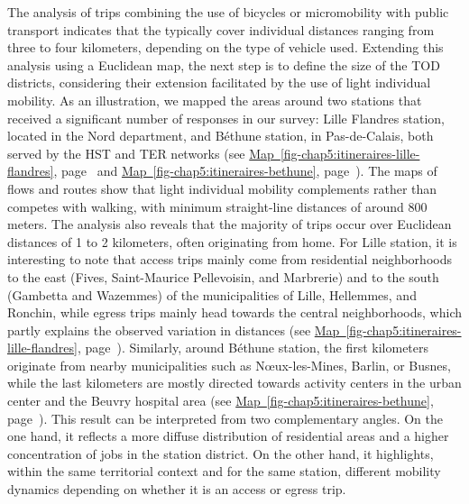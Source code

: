 \begin{refsegment}
The analysis of trips combining the use of bicycles or micromobility with public transport indicates that the  typically cover individual distances ranging from three to four kilometers, depending on the type of vehicle used. Extending this analysis using a Euclidean map, the next step is to define the size of the \acrshort{TOD} districts, considering their extension facilitated by the use of light individual mobility. As an illustration, we mapped the areas around two stations that received a significant number of responses in our survey: Lille Flandres station, located in the Nord department, and Béthune station, in Pas-de-Calais, both served by the \acrshort{HST} and \acrshort{TER} networks (see \hyperref[fig-chap5:itineraires-lille-flandres]{Map~\ref{fig-chap5:itineraires-lille-flandres}}, page~\pageref{fig-chap5:itineraires-lille-flandres} and \hyperref[fig-chap5:itineraires-bethune]{Map~\ref{fig-chap5:itineraires-bethune}}, page~\pageref{fig-chap5:itineraires-bethune}). The maps of flows and routes show that light individual mobility complements rather than competes with walking, with minimum straight-line distances of around 800 meters. The analysis also reveals that the majority of trips occur over Euclidean distances of 1 to 2 kilometers, often originating from home. For Lille station, it is interesting to note that access trips mainly come from residential neighborhoods to the east (Fives, Saint-Maurice Pellevoisin, and Marbrerie) and to the south (Gambetta and Wazemmes) of the municipalities of Lille, Hellemmes, and Ronchin, while egress trips mainly head towards the central neighborhoods, which partly explains the observed variation in distances (see \hyperref[fig-chap5:itineraires-lille-flandres]{Map~\ref{fig-chap5:itineraires-lille-flandres}}, page~\pageref{fig-chap5:itineraires-lille-flandres}). Similarly, around Béthune station, the first kilometers originate from nearby municipalities such as Nœux-les-Mines, Barlin, or Busnes, while the last kilometers are mostly directed towards activity centers in the urban center and the Beuvry hospital area (see \hyperref[fig-chap5:itineraires-bethune]{Map~\ref{fig-chap5:itineraires-bethune}}, page~\pageref{fig-chap5:itineraires-bethune}). This result can be interpreted from two complementary angles. On the one hand, it reflects a more diffuse distribution of residential areas and a higher concentration of jobs in the station district. On the other hand, it highlights, within the same territorial context and for the same station, different mobility dynamics depending on whether it is an access or egress trip.%


\end{refsegment}
